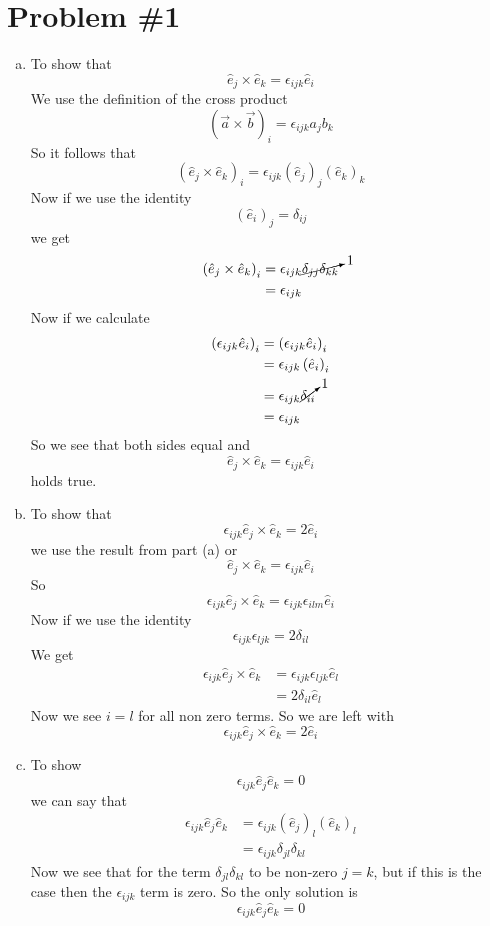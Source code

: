 \documentclass[11pt]{article}
\numberwithin{equation}{section}
\begin{document}


\section{Problem \#1}
\begin{enumerate}[(a)]
\item
To show that
$$\hat{e}_j\times\hat{e}_k = \epsilon_{ijk}\hat{e}_i$$
We use the definition of the cross product 
$$(\vec{a}\times\vec{b})_i = \epsilon_{ijk}a_jb_k$$
So it follows that
$$\left(\hat{e}_j\times\hat{e}_k\right)_i = \epsilon_{ijk}(\hat{e}_j)_j(\hat{e}_k)_k$$
Now if we use the identity
$$(\hat{e}_i)_j = \delta_{ij}$$
we get
\begin{align*}
\left(\hat{e}_j\times\hat{e}_k\right)_i &= \epsilon_{ijk}\cancelto{1}{\delta_{jj}\delta_{kk}}\\
&= \epsilon_{ijk}
\end{align*}
Now if we calculate
\begin{align*}
\left(\epsilon_{ijk}\hat{e}_i\right)_i &= \left(\epsilon_{ijk}\hat{e}_i\right)_i\\ 
&= \epsilon_{ijk}\left(\hat{e}_i\right)_i\\ 
&= \epsilon_{ijk}\cancelto{1}{\delta_{ii}}\\
&= \epsilon_{ijk}
\end{align*}
So we see that both sides equal and
$$\hat{e}_j\times\hat{e}_k = \epsilon_{ijk}\hat{e}_i$$
holds true.

\item
To show that 
$$\epsilon_{ijk}\hat{e}_j\times\hat{e}_k = 2\hat{e}_i$$ 
we use the result from part (a) or
$$\hat{e}_j\times\hat{e}_k = \epsilon_{ijk}\hat{e}_i$$
So
$$\epsilon_{ijk}\hat{e}_j\times\hat{e}_k = \epsilon_{ijk}\epsilon_{ilm}\hat{e}_i$$
Now if we use the identity 
$$\epsilon_{ijk}\epsilon_{ljk} = 2\delta_{il}$$
We get
\begin{align*}
\epsilon_{ijk}\hat{e}_j\times\hat{e}_k &= \epsilon_{ijk}\epsilon_{ljk}\hat{e}_l\\
&= 2\delta_{il}\hat{e}_l
\end{align*}
Now we see $i=l$ for all non zero terms. So we are left with
$$\epsilon_{ijk}\hat{e}_j\times\hat{e}_k = 2\hat{e}_i$$

\item
To show 
$$\epsilon_{ijk}\hat{e}_j\hat{e}_k = 0$$
we can say that
\begin{align*}
\epsilon_{ijk}\hat{e}_j\hat{e}_k &= \epsilon_{ijk}(\hat{e}_j)_l(\hat{e}_k)_l\\
&= \epsilon_{ijk}\delta_{jl}\delta_{kl}
\end{align*}
Now we see that for the term $\delta_{jl}\delta_{kl}$ to be non-zero $j=k$, but if this is the case then the $\epsilon_{ijk}$ term is zero. So the only solution is 
$$\epsilon_{ijk}\hat{e}_j\hat{e}_k = 0$$

\end{enumerate}
\end{document}

